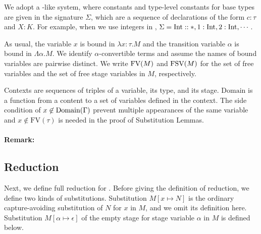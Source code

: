 
We adopt a \LLF-like system, where constants and type-level constants for base types  are given in the signature $\Sigma$, which 
are a sequence of declarations of the form $c:\tau$ and $X:K$.
For example, when we use integers in \LMD, $\Sigma = \textrm{Int} :: *, 1:\textrm{Int}, 2:\textrm{Int}, \cdots$.  

As usual, the variable $x$ is bound in $\lambda x:\tau.M$
and the transition variable $\alpha$ is bound in $\Lambda \alpha.M$.
We identify $\alpha$-convertible terms and assume the names of bound variables are pairwise distinct.
We write $\text{FV}(M)$ and $\text{FSV}(M)$ for the set of free variables and the set of free stage variables in $M$, respectively.

Contexts  are sequences of triples of a variable, its type, and its stage.
$\textrm{Domain}$ is a function from a content to a set of variables defined in the context.
The side condition of $x\not\in\textrm{Domain}(\Gamma)$ prevent multiple appearances of the same variable and
$x\not\in\textrm{FV}(\tau)$ is needed in the proof of Substitution Lemmas.

\paragraph{Remark:}  

\subsection{Reduction}

Next, we define full reduction for \LMD.
Before giving the definition of reduction, we define two kinds of substitutions.
Substitution $M[x\mapsto N]$ is the ordinary capture-avoiding substitution of
$N$ for $x$ in $M$, and we omit its definition here.
Substitution $M[\alpha \mapsto \epsilon]$ of the empty stage
for stage variable $\alpha$ in $M$ is defined below.


